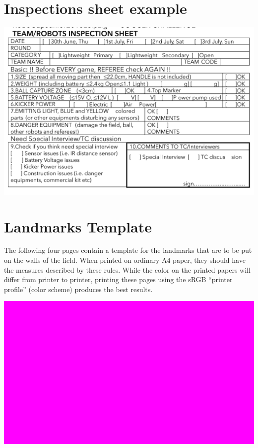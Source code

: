 \documentclass{article}
\begin{document}

\section{Inspections sheet example\label{ref-065}}

\includegraphics[width=1\textwidth]{media/image10.png}

\section{Landmarks Template\label{ref-066}}

The following four pages contain a template for the landmarks that are to be put on the walls of the field. When printed on ordinary A4 paper, they should have the measures described by these rules. While the color on the printed papers will differ from printer to printer, printing these pages using the sRGB ``printer profile'' (color scheme) produces the best results.

\includegraphics[width=1\textwidth]{media/image11.png}
\end{document}
